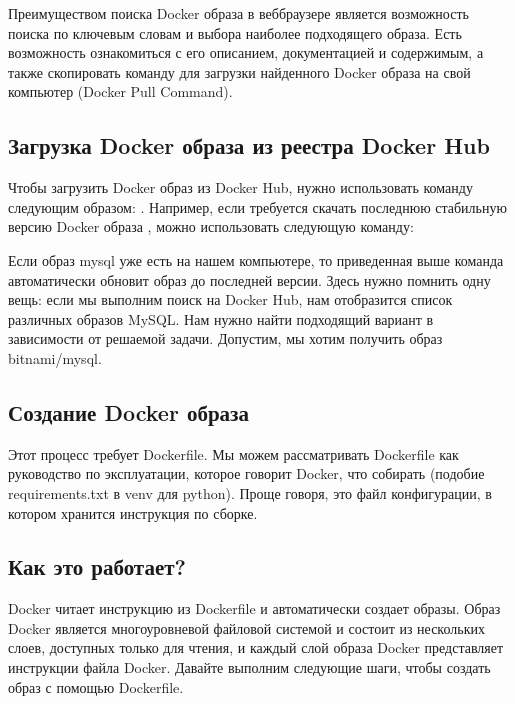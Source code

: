 \documentclass[letterpaper,10pt,russian]{sphinxmanual}
\begin{document}
\sphinxAtStartPar
{}

\sphinxAtStartPar
Преимуществом поиска Docker образа в веб\sphinxhyphen{}браузере является возможность поиска по ключевым словам и выбора наиболее подходящего образа. Есть возможность ознакомиться с его описанием, документацией и содержимым, а также скопировать команду для загрузки найденного Docker образа на свой компьютер (Docker Pull Command).

\sphinxAtStartPar
{}


\subsection{Загрузка Docker образа из реестра Docker Hub}
\label{\detokenize{educational_materials/docker_hub/content:docker-docker-hub}}
\sphinxAtStartPar
Чтобы загрузить Docker образ из Docker Hub, нужно использовать команду  следующим образом: . Например, если требуется скачать последнюю стабильную версию Docker образа , можно использовать следующую команду:

\sphinxAtStartPar
Если образ mysql уже есть на нашем компьютере, то приведенная выше команда автоматически обновит образ до последней версии. Здесь нужно помнить одну вещь: если мы выполним поиск на Docker Hub, нам отобразится список различных образов MySQL. Нам нужно найти подходящий вариант в зависимости от решаемой задачи. Допустим, мы хотим получить образ bitnami/mysql.


\subsection{Создание Docker образа}
\label{\detokenize{educational_materials/docker_hub/content:id3}}
\sphinxAtStartPar
Этот процесс требует Dockerfile. Мы можем рассматривать Dockerfile как руководство по эксплуатации, которое говорит Docker, что собирать (подобие requirements.txt в venv для python). Проще говоря, это файл конфигурации, в котором хранится инструкция по сборке.


\subsection{Как это работает?}
\label{\detokenize{educational_materials/docker_hub/content:id4}}
\sphinxAtStartPar
Docker читает инструкцию из Dockerfile и автоматически создает образы. Образ Docker является многоуровневой файловой системой и состоит из нескольких слоев, доступных только для чтения, и каждый слой образа Docker представляет инструкции файла Docker. Давайте выполним следующие шаги, чтобы создать образ с помощью Dockerfile.
\end{document}
